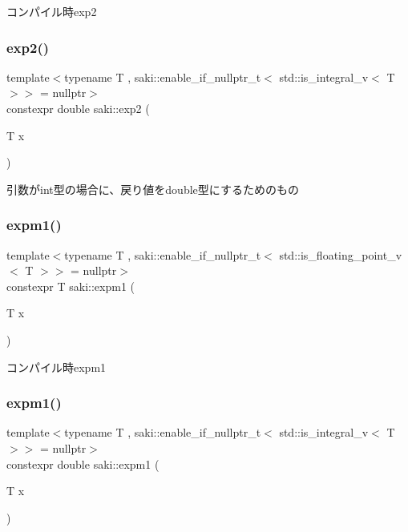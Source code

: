 コンパイル時exp2 

\mbox{\label{namespacesaki_a35e9ce74a5f65c8d38a4901bf513ac1e}} 
\subsubsection{\texorpdfstring{exp2()}{exp2()}\hspace{0.1cm}{\footnotesize\ttfamily [2/2]}}
{\footnotesize\ttfamily template$<$typename T , saki\+::enable\+\_\+if\+\_\+nullptr\+\_\+t$<$ std\+::is\+\_\+integral\+\_\+v$<$ T $>$$>$  = nullptr$>$ \\
constexpr double saki\+::exp2 (\begin{DoxyParamCaption}\item[{T}]{x }\end{DoxyParamCaption})}



引数がint型の場合に、戻り値をdouble型にするためのもの 

\mbox{\label{namespacesaki_aabb63a6251c75f6f1e76a58f5438de69}} 
\subsubsection{\texorpdfstring{expm1()}{expm1()}\hspace{0.1cm}{\footnotesize\ttfamily [1/2]}}
{\footnotesize\ttfamily template$<$typename T , saki\+::enable\+\_\+if\+\_\+nullptr\+\_\+t$<$ std\+::is\+\_\+floating\+\_\+point\+\_\+v$<$ T $>$$>$  = nullptr$>$ \\
constexpr T saki\+::expm1 (\begin{DoxyParamCaption}\item[{T}]{x }\end{DoxyParamCaption})}



コンパイル時expm1 

\mbox{\label{namespacesaki_ae4490f448ed3d82712306c54d6821788}} 
\subsubsection{\texorpdfstring{expm1()}{expm1()}\hspace{0.1cm}{\footnotesize\ttfamily [2/2]}}
{\footnotesize\ttfamily template$<$typename T , saki\+::enable\+\_\+if\+\_\+nullptr\+\_\+t$<$ std\+::is\+\_\+integral\+\_\+v$<$ T $>$$>$  = nullptr$>$ \\
constexpr double saki\+::expm1 (\begin{DoxyParamCaption}\item[{T}]{x }\end{DoxyParamCaption})}




